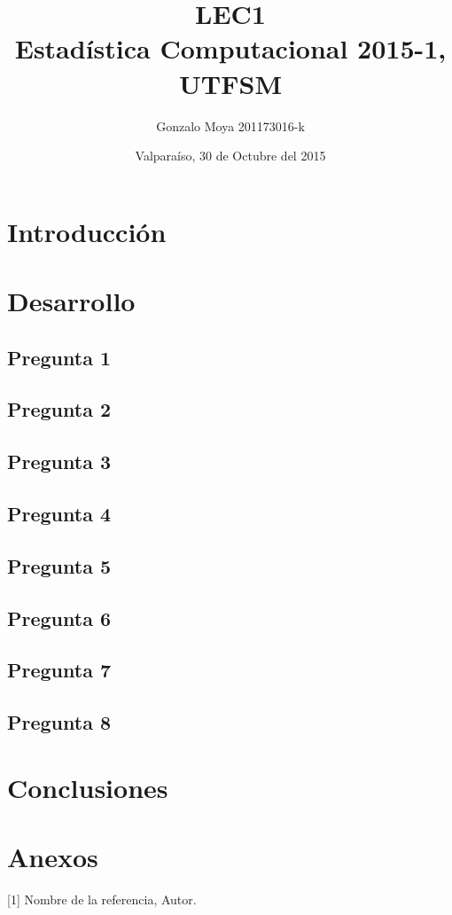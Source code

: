 \documentclass[letter,10pt]{article}
\title{LEC1 \\ Estadística Computacional 2015-1, UTFSM }
\author{Gonzalo Moya 201173016-k}
\date{\vspace*{1cm} Valparaíso, 30 de Octubre del 2015}
\begin{document}
\maketitle
\thispagestyle{empty}
\newpage
\tableofcontents

\makeatother

\newpage

\section{Introducción}
\section{Desarrollo}
\subsection{Pregunta 1}

\subsection{Pregunta 2}

\subsection{Pregunta 3}

\subsection{Pregunta 4}

\subsection{Pregunta 5}

\subsection{Pregunta 6}

\subsection{Pregunta 7}

\subsection{Pregunta 8}


\section{Conclusiones}

\section{Anexos}





[1] Nombre de la referencia, Autor.
\end{document}

